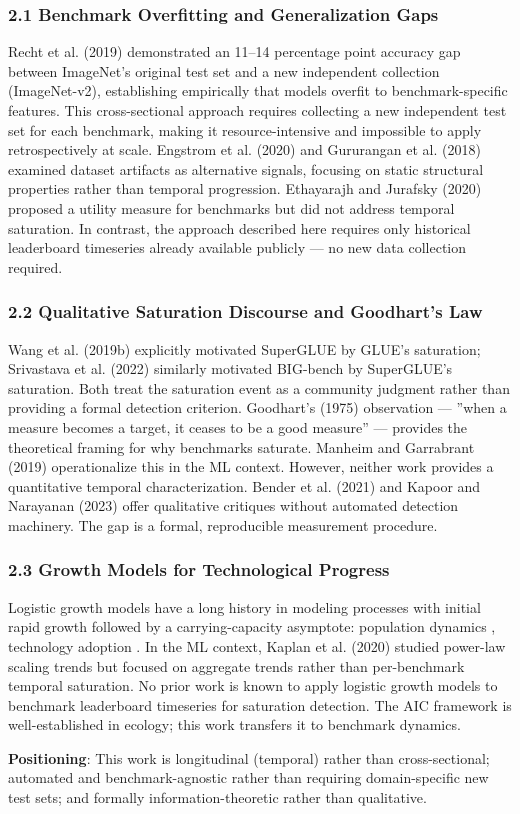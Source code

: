 
\subsubsection{2.1 Benchmark Overfitting and Generalization Gaps}

Recht et al. (2019) demonstrated an 11--14 percentage point accuracy gap between ImageNet's original test set and a new independent collection (ImageNet-v2), establishing empirically that models overfit to benchmark-specific features. This cross-sectional approach requires collecting a new independent test set for each benchmark, making it resource-intensive and impossible to apply retrospectively at scale. Engstrom et al. (2020) and Gururangan et al. (2018) examined dataset artifacts as alternative signals, focusing on static structural properties rather than temporal progression. Ethayarajh and Jurafsky (2020) proposed a utility measure for benchmarks but did not address temporal saturation. In contrast, the approach described here requires only historical leaderboard timeseries already available publicly --- no new data collection required.

\subsubsection{2.2 Qualitative Saturation Discourse and Goodhart's Law}

Wang et al. (2019b) explicitly motivated SuperGLUE by GLUE's saturation; Srivastava et al. (2022) similarly motivated BIG-bench by SuperGLUE's saturation. Both treat the saturation event as a community judgment rather than providing a formal detection criterion. Goodhart's (1975) observation --- ''when a measure becomes a target, it ceases to be a good measure'' --- provides the theoretical framing for why benchmarks saturate. Manheim and Garrabrant (2019) operationalize this in the ML context. However, neither work provides a quantitative temporal characterization. Bender et al. (2021) and Kapoor and Narayanan (2023) offer qualitative critiques without automated detection machinery. The gap is a formal, reproducible measurement procedure.

\subsubsection{2.3 Growth Models for Technological Progress}

Logistic growth models have a long history in modeling processes with initial rapid growth followed by a carrying-capacity asymptote: population dynamics \citep{verhulst1838notice}, technology adoption \citep{bass1969new_product}. In the ML context, Kaplan et al. (2020) studied power-law scaling trends but focused on aggregate trends rather than per-benchmark temporal saturation. No prior work is known to apply logistic growth models to benchmark leaderboard timeseries for saturation detection. The AIC framework \citep{burnham2002model} is well-established in ecology; this work transfers it to benchmark dynamics.

\textbf{Positioning}: This work is longitudinal (temporal) rather than cross-sectional; automated and benchmark-agnostic rather than requiring domain-specific new test sets; and formally information-theoretic rather than qualitative.

